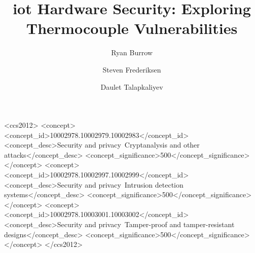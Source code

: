 \documentclass[sigconf,numbers,sort&compress]{acmart}
\begin{document}
\title{\ac{iot} Hardware Security: Exploring Thermocouple Vulnerabilities}

\author{Ryan Burrow}

\author{Steven Frederiksen}

\author{Daulet Talapkaliyev}




%
%
\begin{CCSXML}
<ccs2012>
<concept>
<concept_id>10002978.10002979.10002983</concept_id>
<concept_desc>Security and privacy~Cryptanalysis and other attacks</concept_desc>
<concept_significance>500</concept_significance>
</concept>
<concept>
<concept_id>10002978.10002997.10002999</concept_id>
<concept_desc>Security and privacy~Intrusion detection systems</concept_desc>
<concept_significance>500</concept_significance>
</concept>
<concept>
<concept_id>10002978.10003001.10003002</concept_id>
<concept_desc>Security and privacy~Tamper-proof and tamper-resistant designs</concept_desc>
<concept_significance>500</concept_significance>
</concept>
</ccs2012>
\end{CCSXML}



\maketitle

\printacronyms[include-classes=acron,name=List of Acronyms]










\appendix

\end{document}
